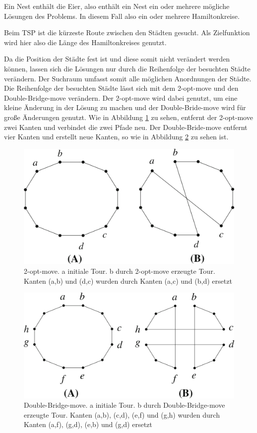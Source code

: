\documentclass[conference]{IEEEtran}
\begin{document}
      Ein Nest enthält die Eier, also enthält ein Nest ein oder mehrere mögliche Lösungen des Problems. 
      In diesem Fall also ein oder mehrere Hamiltonkreise.

      Beim TSP ist die kürzeste Route zwischen den Städten gesucht. Als Zielfunktion wird hier also 
      die Länge des Hamiltonkreises genutzt. 

      Da die Position der Städte fest ist und diese somit nicht verändert werden können, lassen sich 
      die Lösungen nur durch die Reihenfolge der besuchten Städte verändern. Der Suchraum umfasst somit alle 
      möglichen Anordnungen der Städte. Die Reihenfolge der besuchten Städte lässt sich mit dem 2-opt-move \cite{b10} 
      und den Double-Bridge-move \cite{b10} verändern. Der 2-opt-move wird dabei genutzt, um eine kleine Änderung 
      in der Lösung zu machen und der Double-Bride-move wird für große Änderungen genutzt. Wie 
      in Abbildung \ref{fig:2-opt-move} zu sehen, entfernt der 2-opt-move zwei Kanten und verbindet die zwei 
      Pfade neu. Der Double-Bride-move entfernt vier Kanten und erstellt neue Kanten, so wie in 
      Abbildung \ref{fig:double-bridge-move} zu sehen ist.

      \begin{figure}
      \centering
        \includegraphics[width=0.8\linewidth]{2-opt-move.png}
        \caption{2-opt-move. a initiale Tour. b durch 2-opt-move erzeugte Tour. Kanten (a,b) und (d,c) wurden durch Kanten (a,c) und (b,d) ersetzt}
        \label{fig:2-opt-move}
      \end{figure}

      \begin{figure}
      \centering
        \includegraphics[width=0.8\linewidth]{double-Bridge.png}
        \caption{Double-Bridge-move. a initiale Tour. b durch Double-Bridge-move erzeugte Tour. Kanten 
        (a,b), (c,d), (e,f) und (g,h) wurden durch Kanten (a,f), (g,d), (e,b) und (g,d) ersetzt}
        \label{fig:double-bridge-move}
      \end{figure}
\end{document}
